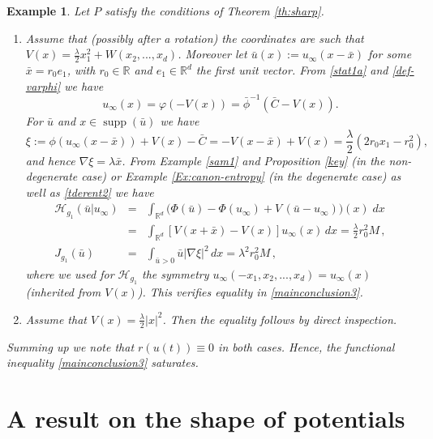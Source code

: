 \documentclass[reqno]{amsart}
\newtheorem{example}[lemma]{Example}
\newcommand{\R}{\mathbb{R}}
\newcommand{\uinf}{u_\infty}
\DeclareMathOperator{\supp}{supp}
\begin{document}
\begin{example}
    Let $P$ satisfy the conditions of Theorem \ref{th:sharp}. 
\begin{enumerate}
    \item[(a)]     
    Assume that (possibly after a rotation) the coordinates are such that $V(x)=\frac{\lambda}{2}x_1^2 +W(x_2,...,x_d)$.  
    Moreover let $\bar u(x):=u_\infty(x-\bar x)$ for some $\bar x=r_0 e_1$, with $r_0\in\R$ and $e_1\in\R^d$ the first unit vector. 
From \eqref{stat1a} and \eqref{def-varphi} we have
$$
  u_\infty(x)=\varphi(-V(x))=\bar \phi^{-1}(\bar C-V(x)).
$$  
For $\bar u$ and $x\in \supp(\bar u)$ we have 
$$
  \xi:=\phi(u_\infty(x-\bar x))+V(x)-\bar C
  =-V(x-\bar x)+V(x) = \frac{\lambda}{2}(2r_0x_1-r_0^2),
$$
and hence $\nabla \xi=\lambda \bar x$.
From Example \ref{sam1} and Proposition \ref{key} (in the non-degenerate case) or Example \ref{Ex:canon-entropy}  (in the degenerate case) as well as \eqref{tderent2} we have
\begin{eqnarray*}
  \mathcal H_{g_1}(\bar u|u_\infty) &=& 
  \int_{\R^d} \big(\Phi(\bar u)-\Phi(\uinf)
+ V\,(\bar u-\uinf)\big)(x)\;dx \\
  &=&  \int_{\R^d} [V(x+\bar x)-V(x)] u_\infty(x)\,dx =\frac{\lambda}{2} r_0^2 M\,, \\
  J_{g_1}(\bar u)&=&\int_{\bar u>0} \bar u|\nabla\xi|^2\,dx=\lambda^2 r_0^2 M\,,
\end{eqnarray*}
where we used for $\mathcal H_{g_1}$ the  
symmetry $u_\infty(-x_1,x_2,...,x_d)=u_\infty(x)$ 
(inherited from $V(x)$). This verifies equality in \eqref{mainconclusion3}.
    \item[(b)] Assume that $V(x)=\frac{\lambda}{2} |x|^2$. Then the equality follows by direct inspection.
\end{enumerate}
Summing up we note that $r(u(t))\equiv 0$ in both cases. Hence, the functional inequality \eqref{mainconclusion3} saturates.
\end{example}


\appendix

\section{A result on the shape of potentials}\label{sec-appendix-aux}
\setcounter{equation}{0}
\end{document}
